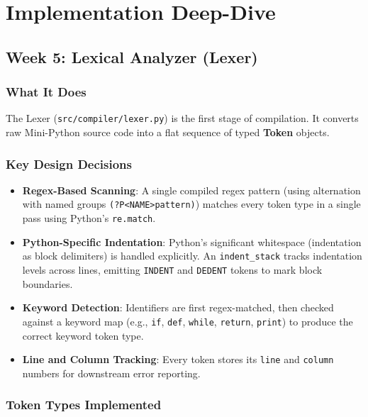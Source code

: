 \documentclass[a4paper,11pt]{article}
\begin{document}
\section{Implementation Deep-Dive}

\subsection{Week 5: Lexical Analyzer (Lexer)}

\subsubsection{What It Does}

The Lexer (\texttt{src/compiler/lexer.py}) is the first stage of compilation. It converts raw Mini-Python source code into a flat sequence of typed \textbf{Token} objects.

\subsubsection{Key Design Decisions}

\begin{itemize}
    \item \textbf{Regex-Based Scanning}: A single compiled regex pattern (using alternation with named groups \texttt{(?P<NAME>pattern)}) matches every token type in a single pass using Python's \texttt{re.match}.
    \item \textbf{Python-Specific Indentation}: Python's significant whitespace (indentation as block delimiters) is handled explicitly. An \texttt{indent\_stack} tracks indentation levels across lines, emitting \texttt{INDENT} and \texttt{DEDENT} tokens to mark block boundaries.
    \item \textbf{Keyword Detection}: Identifiers are first regex-matched, then checked against a keyword map (e.g., \texttt{if}, \texttt{def}, \texttt{while}, \texttt{return}, \texttt{print}) to produce the correct keyword token type.
    \item \textbf{Line and Column Tracking}: Every token stores its \texttt{line} and \texttt{column} numbers for downstream error reporting.
\end{itemize}

\subsubsection{Token Types Implemented}
\end{document}
